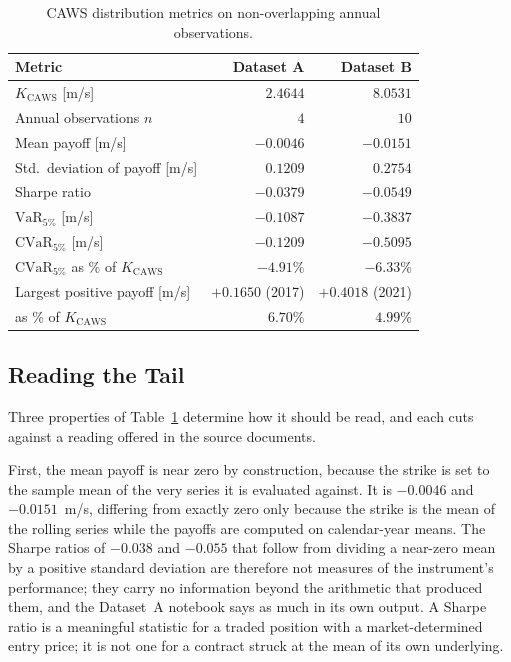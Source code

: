 \documentclass[11pt, a4paper, twoside]{article}
\begin{document}
\begin{table}[htbp]
\centering
\caption{CAWS distribution metrics on non-overlapping annual observations.}
\label{tab:caws-metrics}
\begin{tabular}{l r r}
\toprule
\textbf{Metric} & \textbf{Dataset A} & \textbf{Dataset B} \\
\midrule
$K_{\mathrm{CAWS}}$ [m/s] & $2.4644$ & $8.0531$ \\
Annual observations $n$ & $4$ & $10$ \\
Mean payoff [m/s] & $-0.0046$ & $-0.0151$ \\
Std.\ deviation of payoff [m/s] & $0.1209$ & $0.2754$ \\
Sharpe ratio & $-0.0379$ & $-0.0549$ \\
$\mathrm{VaR}_{5\%}$ [m/s] & $-0.1087$ & $-0.3837$ \\
$\mathrm{CVaR}_{5\%}$ [m/s] & $-0.1209$ & $-0.5095$ \\
\midrule
$\mathrm{CVaR}_{5\%}$ as \% of $K_{\mathrm{CAWS}}$ & $-4.91\%$ & $-6.33\%$ \\
Largest positive payoff [m/s] & $+0.1650$ (2017) & $+0.4018$ (2021) \\
\quad as \% of $K_{\mathrm{CAWS}}$ & $6.70\%$ & $4.99\%$ \\
\bottomrule
\end{tabular}
\end{table}

\subsection{Reading the Tail}
\label{sec:caws-tail}

Three properties of Table~\ref{tab:caws-metrics} determine how it should be read, and each cuts against a reading offered in the source documents.

First, the mean payoff is near zero by construction, because the strike is set to the sample mean of the very series it is evaluated against. It is $-0.0046$ and $-0.0151$~m/s, differing from exactly zero only because the strike is the mean of the rolling series while the payoffs are computed on calendar-year means. The Sharpe ratios of $-0.038$ and $-0.055$ that follow from dividing a near-zero mean by a positive standard deviation are therefore not measures of the instrument's performance; they carry no information beyond the arithmetic that produced them, and the Dataset~A notebook says as much in its own output. A Sharpe ratio is a meaningful statistic for a traded position with a market-determined entry price; it is not one for a contract struck at the mean of its own underlying.
\end{document}
